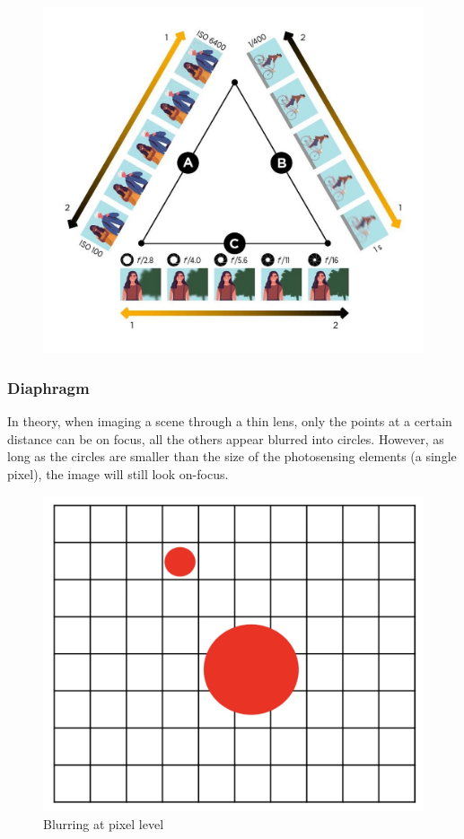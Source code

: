\documentclass{article}
\begin{document}
\begin{figure}[htbp]
  \centering
  \includegraphics[width=0.8\linewidth]{./img/tradeoffs.jpg}
  \label{fig:tradeoffs}
\end{figure}

\subsubsection{Diaphragm}

In theory, when imaging a scene through a thin lens, only the points at a certain distance can be on focus, all the others appear blurred into circles.
However, as long as the circles are smaller than the size of the photosensing elements (a single pixel), the image will still look on-focus.

\begin{figure}[htbp]
  \centering
  \includegraphics[width=0.55\linewidth]{./img/diaphragm.jpg}
  \caption{Blurring at pixel level}
  \label{fig:diaphragm}
\end{figure}
\end{document}
